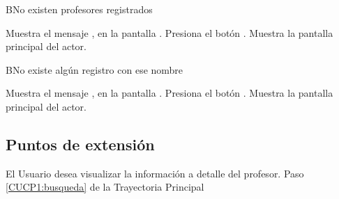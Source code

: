 \begin{UCtrayectoriaA}{B}{No existen profesores registrados}
	
	\UCpaso[\UCsist] Muestra el mensaje , en la pantalla .
	\UCpaso[\UCactor] Presiona el botón .
	\UCpaso[\UCsist] Muestra la pantalla principal del actor.
	
\end{UCtrayectoriaA}
\begin{UCtrayectoriaA}{B}{No existe algún registro con ese nombre}
	
	\UCpaso[\UCsist] Muestra el mensaje , en la pantalla  .
	\UCpaso[\UCactor] Presiona el botón .
	\UCpaso[\UCsist] Muestra la pantalla principal del actor.

\end{UCtrayectoriaA}

\subsection{Puntos de extensión}

\UCExtensionPoint
{El Usuario desea visualizar la información a detalle del profesor.}
{ Paso \ref{CUCP1:busqueda} de la Trayectoria Principal}
{}



